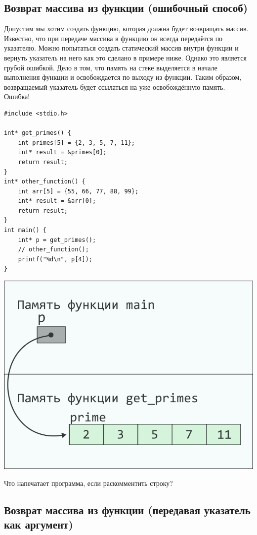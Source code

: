 \documentclass{article}
\begin{document}
\newpage

\subsection*{Возврат массива из функции (ошибочный способ)}
Допустим мы хотим создать функцию, которая должна будет возвращать массив.
Известно, что при передаче массива в функцию он всегда передаётся по указателю.
Можно попытаться создать статический массив внутри функции и вернуть указатель на него как
это сделано в примере ниже.
Однако это является грубой ошибкой. Дело в том, что память на стеке
выделяется в начале выполнения функции и освобождается по выходу из функции.
Таким образом, возвращаемый указатель будет ссылаться на уже освобождённую память. Ошибка!
\begin{multicols}{2}
\begin{lstlisting}
#include <stdio.h>

int* get_primes() {
	int primes[5] = {2, 3, 5, 7, 11};
	int* result = &primes[0];
	return result;
}
int* other_function() {
	int arr[5] = {55, 66, 77, 88, 99};
	int* result = &arr[0];
	return result;
}
int main() {
	int* p = get_primes();
	// other_function();
	printf("%d\n", p[4]);
}
\end{lstlisting}
\columnbreak
\begin{center}
\includegraphics[scale=1]{../images/pointer_schemes/function_return_stack_array.png}
\end{center}
\end{multicols}
Что напечатает программа, если раскомментить строку?

\subsection*{Возврат массива из функции (передавая указатель как аргумент)}
\end{document}
